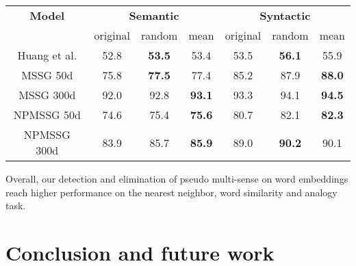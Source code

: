 \documentclass[11pt]{article}
\begin{document}
 \begin{center}
 \begin{tabular}{|c|ccc|ccc|}
 \hline
 \multirow{1}{*}{\textbf{Model}} &\multicolumn{3}{c}{\textbf{Semantic}} & \multicolumn{3}{|c|}{\textbf{Syntactic}}  \\
 & original & random & mean & original & random & mean \\
 \hline 
 Huang et al.  & 52.8 & \textbf{53.5} & 53.4 & 53.5 & \textbf{56.1} & 55.9\\
 MSSG 50d & 75.8  & \textbf{77.5}  & 77.4 & 85.2 & 87.9 & \textbf{88.0}\\
 MSSG 300d & 92.0 & 92.8 & \textbf{93.1} & 93.3& 94.1& \textbf{94.5}\\
 NPMSSG 50d & 74.6 & 75.4 & \textbf{75.6} & 80.7 & 82.1 & \textbf{82.3}\\
 NPMSSG 300d & 83.9 & 85.7 & \textbf{85.9} & 89.0 & \textbf{90.2} & 90.1\\
 \hline
 \end{tabular}
 \end{center}
 
 Overall, our detection and elimination of pseudo multi-sense on word embeddings reach higher performance on the nearest neighbor, word similarity and analogy task.
 
\section{Conclusion and future work}
\end{document}
